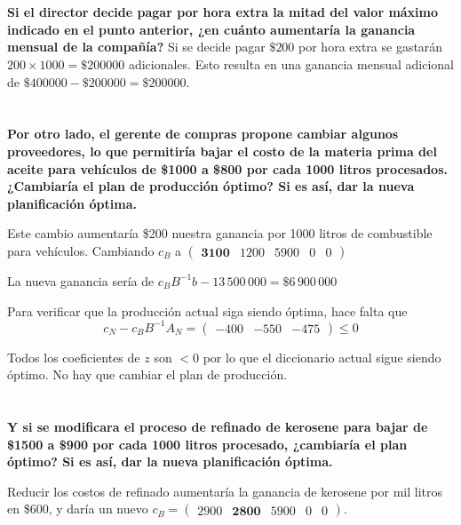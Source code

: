 \documentclass[10pt,a4paper]{article}
\begin{document}
\section{} %
\textbf{Si el director decide pagar por hora extra la mitad del valor máximo indicado en el punto anterior, ¿en cuánto aumentaría la ganancia mensual de la compañía?}
Si se decide pagar $\$200$ por hora extra se gastarán $200 \times 1000 = \$200000$ adicionales. Esto resulta en una ganancia mensual adicional de $\$400000 - \$200000 = \$200000$.

\section{} %
\textbf{Por otro lado, el gerente de compras propone cambiar algunos proveedores, lo que permitiría bajar el costo de la materia prima del aceite para vehículos de \$1000 a \$800 por cada 1000 litros procesados. ¿Cambiaría el plan de producción óptimo? Si es así, dar la nueva planificación óptima.}

\vspace{5mm}

Este cambio aumentaría \$200 nuestra ganancia por 1000 litros de combustible para vehículos. Cambiando $c_B$ a $\begin{pmatrix} \textbf{3100} & 1200 & 5900 & 0 & 0\end{pmatrix}$

La nueva ganancia sería de $c_B B^{-1} b - 13\,500\,000 = \$6\,900\,000$

Para verificar que la producción actual siga siendo óptima, hace falta que
\[
	c_N - c_B B^{-1} A_N = \begin{pmatrix} -400 & -550 & -475 \end{pmatrix} \leq 0
\]

Todos los coeficientes de $z$ son $< 0$ por lo que el diccionario actual sigue siendo óptimo. No hay que cambiar el plan de producción.

\section{} %
\textbf{Y si se modificara el proceso de refinado de kerosene para bajar de \$1500 a \$900 por cada 1000 litros procesado, ¿cambiaría el plan óptimo? Si es así, dar la nueva planificación óptima.}

\vspace{5mm}

Reducir los costos de refinado aumentaría la ganancia de kerosene por mil litros en \$600, y daría un nuevo $c_B = \begin{pmatrix}
	2900 & \textbf{2800} & 5900 & 0 & 0
\end{pmatrix}$.
\end{document}
